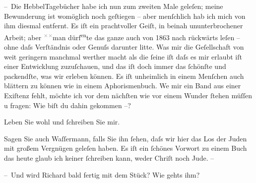 \pstart
           – Die HebbelTagebücher habe ich nun zum zweiten Male
               geleſen; meine Bewunderung ist womöglich noch geſtiegen – aber menſchlich hab ich
               mich von ihm diesmal entfernt. Es iſt ein prachtvoller Geiſt, in beinah
               ununterbrochener Arbeit; aber \substVorne{}\textsuperscript{\textcolor{gray}{×}\-\textcolor{gray}{×}}\substDazwischen{}man\substHinten{} dürf\substVorne{}\textsuperscript{en}\substDazwischen{}te\substHinten{} das ganze auch von 1863 nach rückwärts leſen – ohne daſs
               Verſtändnis {\pb}oder Genuſs darunter litte. Was mir die
               Geſellschaft von weit geringern \introOben{}manchmal\introOben{} werther macht als
               die{ }ſeine iſt daſs es mir erlaubt iſt einer Entwicklung zuzuſchauen, und das iſt doch
               immer das{ }ſchönſte und packendſte, was wir erleben können. Es iſt unheimlich in einem
               Menſchen auch blättern zu können wie in einem Aphorismenbuch. We{\geminationn} mir ein Band aus einer Exiſtenz fehlt, möchte ich vor
                  {\pb}dem nächſten wie vor einem Wunder{ }ſtehen müſſen u
               fragen: Wie biſt du dahin gekommen –?\pend
           
\pstart
           Leben Sie wohl und{ }ſchreiben Sie mir.\pend
           
\pstart
           Sagen Sie auch Waſſermann, falls Sie ihn{ }ſehen, daſs wir hier das Los der Juden mit
               großem Vergnügen geleſen haben. Es iſt ein{ }ſchönes Vorwort zu einem Buch das heute
               glaub ich keiner{ }ſchreiben kann, weder Chriſt noch Jude. –\pend
           
\pstart
           – Und wird Richard bald {\pb}fertig mit dem Stück? Wie gehts ihm?\pend
           
